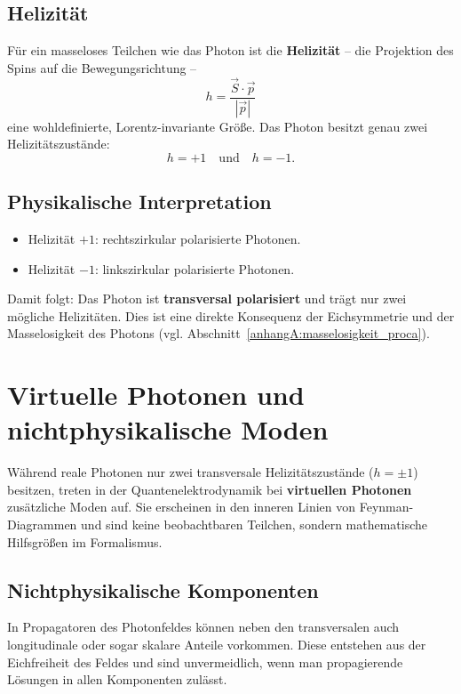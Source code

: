 \subsection*{Helizität}
Für ein masseloses Teilchen wie das Photon ist die 
\textbf{Helizität} – die Projektion des Spins auf die 
Bewegungsrichtung –
\[
h = \frac{\vec{S} \cdot \vec{p}}{|\vec{p}|}
\]
eine wohldefinierte, Lorentz-invariante Größe.  
Das Photon besitzt genau zwei Helizitätszustände:
\[
h = +1 \quad \text{und} \quad h = -1 .
\]

\subsection*{Physikalische Interpretation}
\begin{itemize}
	\item Helizität \( +1 \): rechtszirkular polarisierte Photonen.
	\item Helizität \( -1 \): linkszirkular polarisierte Photonen.
\end{itemize}

\medskip
Damit folgt: Das Photon ist \textbf{transversal polarisiert}
und trägt nur zwei mögliche Helizitäten.  
Dies ist eine direkte Konsequenz der Eichsymmetrie und der
Masselosigkeit des Photons 
(vgl. Abschnitt~\ref{anhangA:masselosigkeit_proca}).
\section{Virtuelle Photonen und nichtphysikalische Moden}
\label{anhangA:virtuelle_moden}

Während reale Photonen nur zwei transversale Helizitätszustände 
(\( h = \pm 1 \)) besitzen, treten in der Quantenelektrodynamik 
bei \textbf{virtuellen Photonen} zusätzliche Moden auf. 
Sie erscheinen in den inneren Linien von Feynman-Diagrammen und 
sind keine beobachtbaren Teilchen, sondern mathematische Hilfsgrößen 
im Formalismus.

\subsection*{Nichtphysikalische Komponenten}
In Propagatoren des Photonfeldes können neben den transversalen
auch longitudinale oder sogar skalare Anteile vorkommen.  
Diese entstehen aus der Eichfreiheit des Feldes 
und sind unvermeidlich, wenn man propagierende Lösungen in allen 
Komponenten zulässt.

